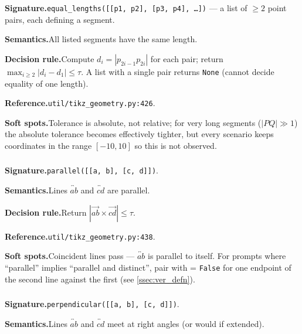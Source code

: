 \noindent\textbf{Signature.}\quad \texttt{equal\_lengths([[p1, p2], [p3, p4], \dots])} --- a list of $\geq 2$ point pairs, each defining a segment.

\noindent\textbf{Semantics.}\quad All listed segments have the same length.

\noindent\textbf{Decision rule.}\quad Compute $d_i = |p_{2i-1} p_{2i}|$ for each pair; return $\max_{i\geq 2} |d_i - d_1| \leq \tau$.
A list with a single pair returns \texttt{None} (cannot decide equality of one length).

\noindent\textbf{Reference.}\quad \texttt{util/tikz\_geometry.py:426}.

\noindent\textbf{Soft spots.}\quad Tolerance is absolute, not relative; for very long segments ($|PQ| \gg 1$) the absolute tolerance becomes effectively tighter, but every \GeoGenBench scenario keeps coordinates in the range $[-10, 10]$ so this is not observed.

\subsubsection{}
\label{app:pred:parallel}

\noindent\textbf{Signature.}\quad \texttt{parallel([[a, b], [c, d]])}.

\noindent\textbf{Semantics.}\quad Lines $\overleftrightarrow{ab}$ and $\overleftrightarrow{cd}$ are parallel.

\noindent\textbf{Decision rule.}\quad Return $|\vec{ab}\times\vec{cd}| \leq \tau$.

\noindent\textbf{Reference.}\quad \texttt{util/tikz\_geometry.py:438}.

\noindent\textbf{Soft spots.}\quad Coincident lines pass --- $\overleftrightarrow{ab}$ is parallel to itself.
For prompts where ``parallel'' implies ``parallel and distinct'', pair with  = \texttt{False} for one endpoint of the second line against the first (see \cref{ssec:ver_defn}).

\subsubsection{}
\label{app:pred:perpendicular}

\noindent\textbf{Signature.}\quad \texttt{perpendicular([[a, b], [c, d]])}.

\noindent\textbf{Semantics.}\quad Lines $\overleftrightarrow{ab}$ and $\overleftrightarrow{cd}$ meet at right angles (or would if extended).

